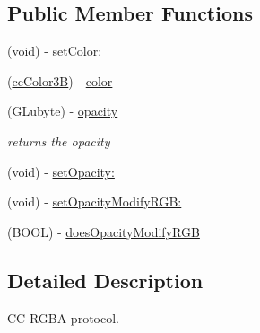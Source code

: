 \subsection*{Public Member Functions}
\begin{DoxyCompactItemize}
\item 
(void) -\/ \hyperlink{protocol_c_c_r_g_b_a_protocol-p_aec4b5f156bd5220e9a0f04808d9e76b0}{set\-Color\-:}
\item 
(\hyperlink{cc_types_8h_a829b00c53e72f0115e3880cb508fec1e}{cc\-Color3\-B}) -\/ \hyperlink{protocol_c_c_r_g_b_a_protocol-p_aa637a1a2d8f5ea584415f86a7b4b8662}{color}
\item 
\hypertarget{protocol_c_c_r_g_b_a_protocol-p_ad73d11acdddb208eab3f6b9b42d80211}{(G\-Lubyte) -\/ \hyperlink{protocol_c_c_r_g_b_a_protocol-p_ad73d11acdddb208eab3f6b9b42d80211}{opacity}}\label{protocol_c_c_r_g_b_a_protocol-p_ad73d11acdddb208eab3f6b9b42d80211}

\begin{DoxyCompactList}\small\item\em returns the opacity \end{DoxyCompactList}\item 
(void) -\/ \hyperlink{protocol_c_c_r_g_b_a_protocol-p_a66324c50934259d3fc0e124cf0b7eca2}{set\-Opacity\-:}
\item 
(void) -\/ \hyperlink{protocol_c_c_r_g_b_a_protocol-p_a4c01d6205f4b6194efb1dd853d4ab6be}{set\-Opacity\-Modify\-R\-G\-B\-:}
\item 
(B\-O\-O\-L) -\/ \hyperlink{protocol_c_c_r_g_b_a_protocol-p_a960810f5a2bb95f4306ae8d15e1c91fa}{does\-Opacity\-Modify\-R\-G\-B}
\end{DoxyCompactItemize}


\subsection{Detailed Description}
C\-C R\-G\-B\-A protocol. 

